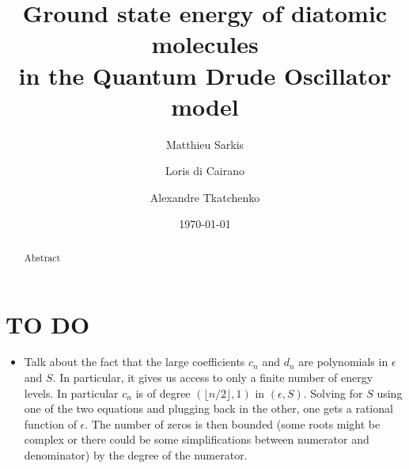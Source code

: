 \documentclass[reprint, amsmath, amssymb, aps, prl]{revtex4-2}
\begin{document}

\title{Ground state energy of diatomic molecules\\ in the Quantum Drude Oscillator model}

\author{Matthieu Sarkis}

\author{Loris di Cairano}%

\author{Alexandre Tkatchenko}%



\date{\today}

\begin{abstract}
Abstract
\end{abstract}

\maketitle


\section*{TO DO}

    \begin{itemize}
        \item Talk about the fact that the large coefficients $c_n$ and $d_n$ are polynomials in $\epsilon$ and $S$. In particular, it gives us access to only a finite number of energy levels. In particular $c_n$ is of degree $(\lfloor n/2\rfloor, 1)$ in $(\epsilon, S)$. Solving for $S$ using one of the two equations and plugging back in the other, one gets a rational function of $\epsilon$. The number of zeros is then bounded (some roots might be complex or there could be some simplifications between numerator and denominator) by the degree of the numerator.
    \end{itemize}
\end{document}
